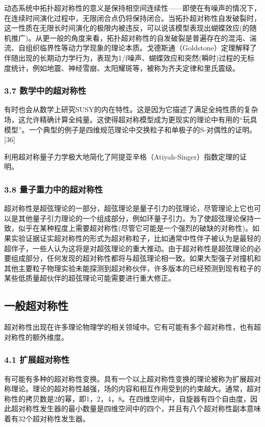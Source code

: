 动态系统中拓扑超对称性的意义是保持相空间连续性——即使在有噪声的情况下，在连续时间演化过程中，无限闭合点仍将保持闭合。当拓扑超对称性自发破裂时，这一性质在无限长时间演化的极限内被违反，可以说该模型表现出蝴蝶效应(的随机推广)。从更一般的角度来看，拓扑超对称性的自发破裂是普遍存在的混沌、湍流、自组织临界性等动力学现象的理论本质。戈德斯通（Goldstone）定理解释了伴随出现的长期动力学行为，表现为1/f噪声、蝴蝶效应和突然(瞬时)过程的无标度统计，例如地震、神经雪崩、太阳耀斑等，被称为齐夫定律和里氏震级。
\subsubsection{3.7 数学中的超对称性}
有时也会从数学上研究SUSY的内在特性。这是因为它描述了满足全纯性质的复杂场，这允许精确计算全纯量。这使得超对称模型成为更现实的理论中有用的“玩具模型”。一个典型的例子是四维规范理论中交换粒子和单极子的S-对偶性的证明。[36]

利用超对称量子力学极大地简化了阿提亚辛格（Atiyah-Singer）指数定理的证明。
\subsubsection{3.8 量子重力中的超对称性}
超对称性是超弦理论的一部分，超弦理论是量子引力的弦理论，尽管理论上它也可以是其他量子引力理论的一个组成部分，例如环量子引力。为了使超弦理论保持一致，似乎在某种程度上需要超对称性(尽管它可能是一个强烈的破缺的对称性)。如果实验证据证实超对称性的形式为超对称粒子，比如通常中性伴子被认为是最轻的超伴子，一些人认为这将是对超弦理论的重大推动。由于超对称性是超弦理论的必要组成部分，任何发现的超对称性都将与超弦理论相一致。如果大型强子对撞机和其他主要粒子物理实验未能探测到超对称伙伴，许多版本的已经预测到现有粒子的某些低质量超伙伴的超弦理论可能需要进行重大修正。

\subsection{一般超对称性}
超对称性出现在许多理论物理学的相关领域中。它有可能有多个超对称性，也有超对称性的额外维度。
\subsubsection{4.1 扩展超对称性}
有可能有多种的超对称性变换。具有一个以上超对称性变换的理论被称为扩展超对称理论。理论的超对称性越强，场的内容和相互作用受到的约束越大。通常，超对称性的拷贝数是2的幂，即1，2，4，8。在四维空间中，自旋器有四个自由度，因此超对称性发生器的最小数量是四维空间中的四个，并且有八个超对称性副本意味着有32个超对称性发生器。

